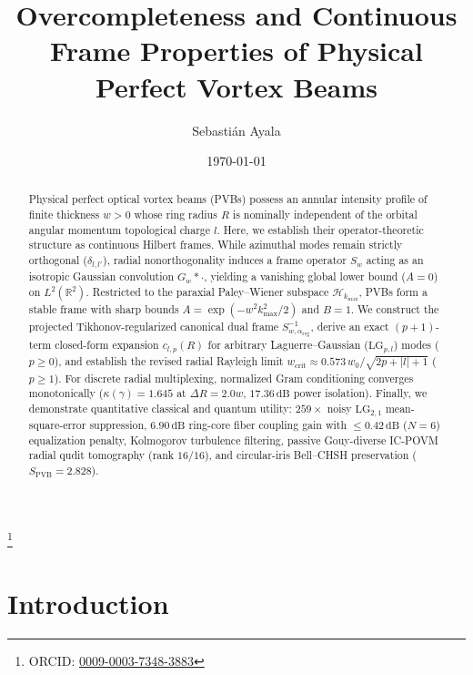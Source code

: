 \documentclass[aps,pra,onecolumn,notitlepage,11pt,tightenlines,amsmath,amssymb,floatfix,longbibliography]{revtex4-2}
\providecommand{\abs}[1]{\lvert#1\rvert}
\begin{document}
\title{Overcompleteness and Continuous Frame Properties of Physical Perfect Vortex Beams}

\author{Sebasti\'an Ayala}
\thanks{ORCID: \href{https://orcid.org/0009-0003-7348-3883}{0009-0003-7348-3883}}

\date{\today}

\begin{abstract}
Physical perfect optical vortex beams (PVBs) possess an annular intensity profile of finite thickness $w > 0$ whose ring radius $R$ is nominally independent of the orbital angular momentum topological charge $l$. Here, we establish their operator-theoretic structure as continuous Hilbert frames. While azimuthal modes remain strictly orthogonal ($\delta_{l,l'}$), radial nonorthogonality induces a frame operator $S_w$ acting as an isotropic Gaussian convolution $G_w * \cdot$, yielding a vanishing global lower bound ($A = 0$) on $L^2(\mathbb{R}^2)$. Restricted to the paraxial Paley--Wiener subspace $\mathcal{H}_{k_{\max}}$, PVBs form a stable frame with sharp bounds $A = \exp(-w^2 k_{\max}^2/2)$ and $B = 1$. We construct the projected Tikhonov-regularized canonical dual frame $S_{w,\alpha_{\mathrm{reg}}}^{-1}$, derive an exact $(p+1)$-term closed-form expansion $c_{l,p}(R)$ for arbitrary Laguerre--Gaussian ($\mathrm{LG}_{p,l}$) modes ($p \ge 0$), and establish the revised radial Rayleigh limit $w_{\mathrm{crit}} \approx 0.573\,w_0/\sqrt{2p+\abs{l}+1}$ ($p \ge 1$). For discrete radial multiplexing, normalized Gram conditioning converges monotonically ($\kappa(\gamma) = 1.645$ at $\Delta R = 2.0w$, $17.36\,\mathrm{dB}$ power isolation). Finally, we demonstrate quantitative classical and quantum utility: $259\times$ noisy $\mathrm{LG}_{2,1}$ mean-square-error suppression, $6.90\,\mathrm{dB}$ ring-core fiber coupling gain with $\le 0.42\,\mathrm{dB}$ ($N=6$) equalization penalty, Kolmogorov turbulence filtering, passive Gouy-diverse IC-POVM radial qudit tomography (rank $16/16$), and circular-iris Bell--CHSH preservation ($S_{\mathrm{PVB}} = 2.828$).
\end{abstract}

\maketitle

\section{Introduction}
\label{sec:intro}
\end{document}
